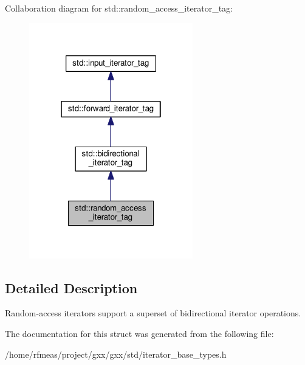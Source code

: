 Collaboration diagram for std\+:\+:random\+\_\+access\+\_\+iterator\+\_\+tag\+:
\nopagebreak
\begin{figure}[H]
\begin{center}
\leavevmode
\includegraphics[width=202pt]{structstd_1_1random__access__iterator__tag__coll__graph}
\end{center}
\end{figure}


\subsection{Detailed Description}
Random-\/access iterators support a superset of bidirectional iterator operations. 

The documentation for this struct was generated from the following file\+:\begin{DoxyCompactItemize}
\item 
/home/rfmeas/project/gxx/gxx/std/iterator\+\_\+base\+\_\+types.\+h\end{DoxyCompactItemize}
